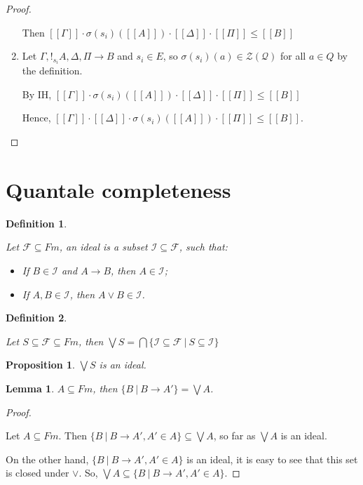 \documentclass[a4paper]{article}
\newtheorem{prop}{Proposition}
\newtheorem{lemma}{Lemma}
\newtheorem{defin}{Definition}
\begin{document}
\begin{proof}
\begin{enumerate}
Then $[\![\Gamma]\!] \cdot \sigma(s_i)([\![A]\!]) \cdot [\![\Delta]\!] \cdot [\![\Pi]\!] \leq [\![B]\!]$

\item Let $\Gamma, !_{s_i} A, \Delta, \Pi \rightarrow B$ and $s_i \in E$, so $\sigma(s_i)(a) \in \mathcal{Z}(\mathcal{Q})$ for all $a \in Q$ by the definition.

By IH, $[\![\Gamma]\!] \cdot \sigma(s_i)([\![A]\!]) \cdot [\![\Delta]\!] \cdot [\![\Pi]\!] \leq [\![B]\!]$

Hence, $[\![\Gamma]\!] \cdot [\![\Delta]\!] \cdot \sigma(s_i)([\![A]\!]) \cdot [\![\Pi]\!] \leq [\![B]\!]$.

\end{enumerate}

\end{proof}

\section{Quantale completeness}

\begin{defin}
$ $

  Let $\mathcal{F} \subseteq Fm$, an ideal is a subset $\mathcal{I} \subseteq \mathcal{F}$, such that:

\begin{itemize}
  \item If $B \in \mathcal{I}$ and $A \rightarrow B$, then $A \in \mathcal{I}$;
  \item If $A, B \in \mathcal{I}$, then $A \lor B \in \mathcal{I}$.
\end{itemize}
\end{defin}

\begin{defin}
$ $

  Let $S \subseteq \mathcal{F} \subseteq Fm$,
  then $\bigvee S = \bigcap \{ \mathcal{I} \subseteq \mathcal{F} \: | \: S \subseteq \mathcal{I} \}$
\end{defin}

\begin{prop}
  $\bigvee S$ is an ideal.
\end{prop}

\begin{lemma}
  $A \subseteq Fm$, then $\{ B \: | \: B \rightarrow A' \} = \bigvee A$.
\end{lemma}

\begin{proof}
$ $

Let $A \subseteq Fm$. Then $\{ B \: | \: B \rightarrow A', A' \in A \} \subseteq \bigvee A$, so far as $\bigvee A$ is an ideal.

On the other hand, $\{ B \: | \: B \rightarrow A', A' \in A \}$ is an ideal, it is easy to see that this set is closed under $\lor$.
So, $\bigvee A \subseteq \{ B \: | \: B \rightarrow A', A' \in A \}$.
\end{proof}
\end{document}
